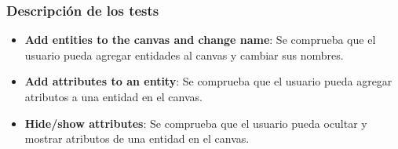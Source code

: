 
\subsubsection{Descripción de los tests}
\begin{itemize}
    \item \textbf{Add entities to the canvas and change name}:
    Se comprueba que el usuario pueda agregar entidades al canvas y cambiar sus nombres.

    \item \textbf{Add attributes to an entity}:
    Se comprueba que el usuario pueda agregar atributos a una entidad en el canvas.

    \item \textbf{Hide/show attributes}:
    Se comprueba que el usuario pueda ocultar y mostrar atributos de una entidad en el canvas.
\end{itemize}
